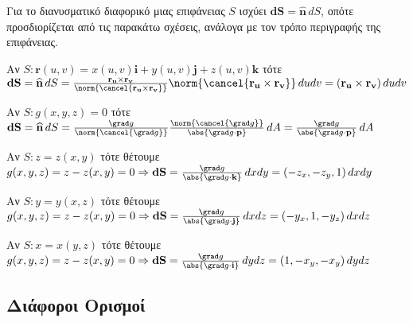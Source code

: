\documentclass[a4paper,table]{report}
\begin{document}
\begin{dfn}
  Για το διανυσματικό διαφορικό μιας επιφάνειας $S$ ισχύει $ \mathbf{dS} =
  \mathbf{\widehat{n}}\,dS $, οπότε προσδιορίζεται από τις παρακάτω σχέσεις, ανάλογα με τον τρόπο περιγραφής της επιφάνειας.
  \begin{myitemize}
    \item Αν $ S\colon \mathbf{r}(u,v) = x(u,v)\mathbf{i}+y(u,v)\mathbf{j}+z(u,v)\mathbf{k} $ 
      τότε $ \mathbf{dS} = \mathbf{\widehat{n}}\, dS = \frac{\mathbf{r_{u}} \times 
      \mathbf{r_{v}}}{\norm{\cancel{\mathbf{r_{u}} \times \mathbf{r_{v}}}}}
      \norm{\cancel{\mathbf{r_{u}} \times \mathbf{r_{v}}}} \, du dv = (\mathbf{r_{u}} \times 
      \mathbf{r_{v}}) \,du dv $ 
    \item Αν $ S\colon g(x,y,z)=0 $ τότε $ \mathbf{dS} = \mathbf{\widehat{n}}\, dS = 
      \frac{\grad g}{\norm{\cancel{\grad g}}} \frac{\norm{\cancel{\grad g}}}{\abs{\grad g 
      \cdot \mathbf{p}}}\, dA = \frac{\grad g}{\abs{\grad g \cdot \mathbf{p}}}\, dA$
    \item Αν $ S\colon z=z(x,y) $ τότε θέτουμε $ g(x,y,z)=z-z(x,y)=0 \Rightarrow \mathbf{dS} 
      = \frac{\grad g}{\abs{\grad g \cdot \mathbf{k}}}\, dxdy = (-z_{x},-z_{y},1) 
      \, dx dy $
    \item Αν $ S\colon y=y(x,z) $ τότε θέτουμε $ g(x,y,z)=z-z(x,y)=0 \Rightarrow \mathbf{dS} 
      = \frac{\grad g}{\abs{\grad g \cdot \mathbf{j}}}\, dxdz = (-y_{x},1,-y_{z}) 
      \, dx dz $
    \item Αν $ S\colon x=x(y,z) $ τότε θέτουμε $ g(x,y,z)=z-z(x,y)=0 \Rightarrow \mathbf{dS} 
      = \frac{\grad g}{\abs{\grad g \cdot \mathbf{i}}}\, dydz = (1,-x_{y},-x_{y}) 
      \, dy dz $
  \end{myitemize}
\end{dfn}


\subsection*{Διάφοροι Ορισμοί}
 
\end{document}
